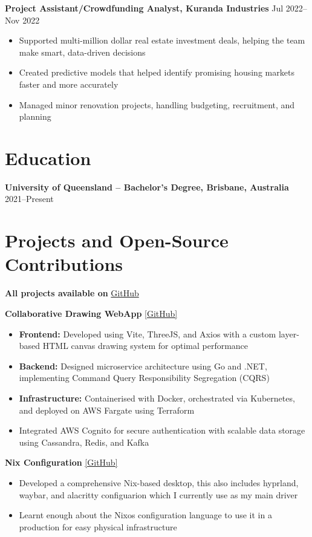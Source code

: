 \documentclass[10pt,a4paper]{article}
\begin{document}
	\textbf{Project Assistant/Crowdfunding Analyst, Kuranda Industries} \hfill Jul 2022--Nov 2022 
	\begin{itemize}[label=\textbullet, itemsep=0.05cm]
		\item Supported multi-million dollar real estate investment deals, helping the team make smart, data-driven decisions
		\item Created predictive models that helped identify promising housing markets faster and more accurately
		\item Managed minor renovation projects, handling budgeting, recruitment, and planning
	\end{itemize}
	
	\section{Education}
	\textbf{University of Queensland -- 		Bachelor's Degree, Brisbane, Australia} \hfill 2021--Present \\	
	\section{Projects and Open-Source Contributions}
	\textbf{All projects available on} \href{https://github.com/CameronBadman}{GitHub}
	
	\textbf{Collaborative Drawing WebApp} \href{https://github.com/CameronBadman/Canvis-collab-webapp}{[GitHub]}
	\begin{itemize}[label=\textbullet, itemsep=0.05cm]
		\item \textbf{Frontend:} Developed using Vite, ThreeJS, and Axios with a custom layer-based HTML canvas drawing system for optimal performance
		\item \textbf{Backend:} Designed microservice architecture using Go and .NET, implementing Command Query Responsibility Segregation (CQRS)
		\item \textbf{Infrastructure:} Containerised with Docker, orchestrated via Kubernetes, and deployed on AWS Fargate using Terraform
		\item Integrated AWS Cognito for secure authentication with scalable data storage using Cassandra, Redis, and Kafka
	\end{itemize}
	
	\textbf{Nix Configuration} \href{https://github.com/CameronBadman/nvim-config}{[GitHub]}
	\begin{itemize}[label=\textbullet, itemsep=0.05cm]
		\item Developed a comprehensive Nix-based desktop, this also includes hyprland, waybar, and alacritty configuarion which I currently use as my main driver
		\item Learnt enough about the Nixos configuration language to use it in a production for easy physical infrastructure
	\end{itemize}
	
\end{document}
